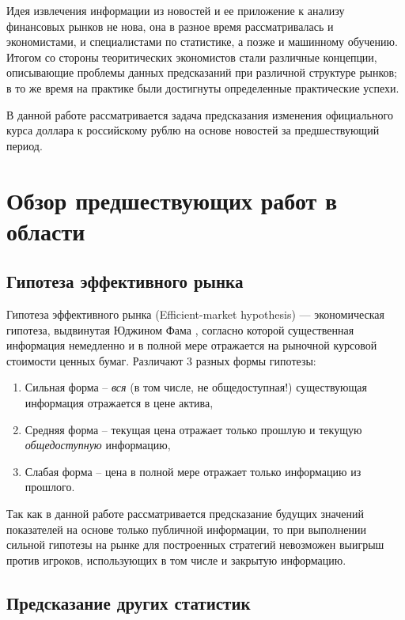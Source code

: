 \documentclass[pdftex,ptm,12pt,a4paper]{report}
\begin{document}
Идея извлечения информации из новостей и ее приложение к анализу финансовых рынков не нова, она
в разное время рассматривалась и экономистами, и специалистами по статистике, а позже и машинному обучению.
Итогом со стороны теоритических экономистов стали различные концепции,
описывающие проблемы данных предсказаний при различной структуре рынков; в то же время на практике
были достигнуты определенные практические успехи.

В данной работе рассматривается задача предсказания изменения официального курса доллара к российскому рублю
на основе новостей за предшествующий период.

\chapter{Обзор предшествующих работ в области}

\section{Гипотеза эффективного рынка}

Гипотеза эффективного рынка (Efficient-market hypothesis) --- экономическая гипотеза, выдвинутая Юджином Фама \cite{EFH}, согласно которой существенная информация немедленно и в полной мере отражается на рыночной курсовой стоимости ценных бумаг. Различают 3 разных формы гипотезы:

\begin{enumerate}
\item Сильная форма -- \textit{вся} (в том числе, не общедоступная!) существующая информация отражается в цене актива,
\item Средняя форма -- текущая цена отражает только прошлую и текущую \textit{общедоступную} информацию,
\item Слабая форма -- цена в полной мере отражает только информацию из прошлого.
\end{enumerate}

Так как в данной работе рассматривается предсказание будущих значений показателей на основе только публичной информации,
то при выполнении сильной гипотезы на рынке для построенных стратегий невозможен выигрыш против игроков, использующих в том
числе и закрытую информацию.

\section{Предсказание других статистик}
\end{document}
